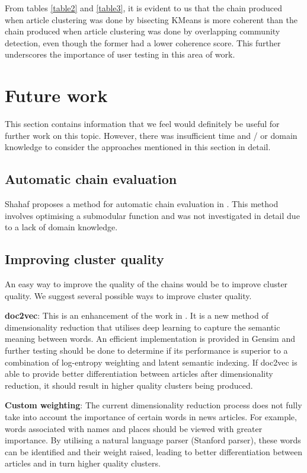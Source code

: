 \documentclass[12pt]{article}
\begin{document}
From tables \ref{table2} and \ref{table3}, it is evident to us that the chain produced when article clustering was done by bisecting KMeans is more coherent than the chain produced when article clustering was done by overlapping community detection, even though the former had a lower coherence score. This further underscores the importance of user testing in this area of work.

\newpage
\section{Future work}
This section contains information that we feel would definitely be useful for further work on this topic. However, there was insufficient time and / or domain knowledge to consider the approaches mentioned in this section in detail.

\subsection{Automatic chain evaluation}
Shahaf proposes a method for automatic chain evaluation in \cite{infocartography}. This method involves optimising a submodular function and was not investigated in detail due to a lack of domain knowledge.

\subsection{Improving cluster quality}
An easy way to improve the quality of the chains would be to improve cluster quality. We suggest several possible ways to improve cluster quality.

\textbf{doc2vec}: This is an enhancement of the work in \cite{word2vec}. It is a new method of dimensionality reduction that utilises deep learning to capture the semantic meaning between words. An efficient implementation is provided in Gensim and further testing should be done to determine if its performance is superior to a combination of log-entropy weighting and latent semantic indexing. If doc2vec is able to provide better differentiation between articles after dimensionality reduction, it should result in higher quality clusters being produced.

\textbf{Custom weighting}: The current dimensionality reduction process does not fully take into account the importance of certain words in news articles. For example, words associated with names and places should be viewed with greater importance. By utilising a natural language parser (Stanford parser), these words can be identified and their weight raised, leading to better differentiation between articles and in turn higher quality clusters.
\end{document}
